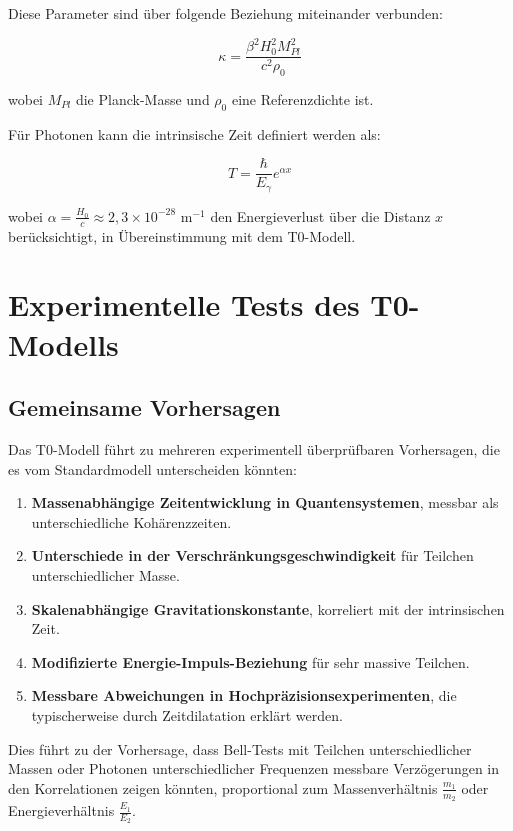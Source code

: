 \documentclass[a4paper,12pt]{article}
\begin{document}
	Diese Parameter sind über folgende Beziehung miteinander verbunden:
	
	\begin{equation}
		\kappa = \frac{\beta^2 H_0^2 M_{Pl}^2}{c^2 \rho_0}
	\end{equation}
	
	wobei $M_{Pl}$ die Planck-Masse und $\rho_0$ eine Referenzdichte ist.
	
	Für Photonen kann die intrinsische Zeit definiert werden als:
	
	\begin{equation}
		T = \frac{\hbar}{E_{\gamma}} e^{\alpha x}
	\end{equation}
	
	wobei $\alpha = \frac{H_0}{c} \approx 2,3 \times 10^{-28}$ m$^{-1}$ den Energieverlust über die Distanz $x$ berücksichtigt, in Übereinstimmung mit dem T0-Modell.
	
	\section{Experimentelle Tests des T0-Modells}
	
	\subsection{Gemeinsame Vorhersagen}
	
	Das T0-Modell führt zu mehreren experimentell überprüfbaren Vorhersagen, die es vom Standardmodell unterscheiden könnten:
	
	\begin{enumerate}
		\item \textbf{Massenabhängige Zeitentwicklung in Quantensystemen}, messbar als unterschiedliche Kohärenzzeiten.
		\item \textbf{Unterschiede in der Verschränkungsgeschwindigkeit} für Teilchen unterschiedlicher Masse.
		\item \textbf{Skalenabhängige Gravitationskonstante}, korreliert mit der intrinsischen Zeit.
		\item \textbf{Modifizierte Energie-Impuls-Beziehung} für sehr massive Teilchen.
		\item \textbf{Messbare Abweichungen in Hochpräzisionsexperimenten}, die typischerweise durch Zeitdilatation erklärt werden.
	\end{enumerate}
	
	Dies führt zu der Vorhersage, dass Bell-Tests mit Teilchen unterschiedlicher Massen oder Photonen unterschiedlicher Frequenzen messbare Verzögerungen in den Korrelationen zeigen könnten, proportional zum Massenverhältnis $\frac{m_1}{m_2}$ oder Energieverhältnis $\frac{E_1}{E_2}$.
	
\end{document}
